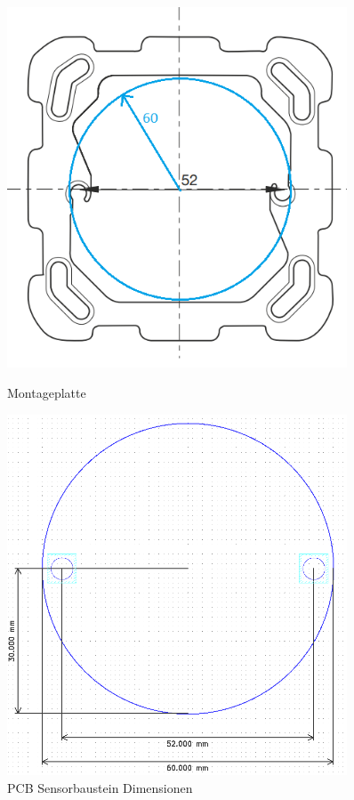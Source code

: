 \begin{figure}[htb]
	\centering
	\begin{minipage}[t]{0.45\linewidth}
		\centering
		\includegraphics[width=0.9\textwidth]{graphics/Montageplatte.png}
		\caption{Montageplatte \cite{hager_hager_kat1_08_technik_d_2019} }
		\label{pic: Montageplatte.png}
	\end{minipage}%
	\hfill
	\begin{minipage}[t]{0.45\linewidth}
		\centering
		\includegraphics[width=0.90\textwidth]{graphics/pcb_sensor_dimensionen.png}
		\caption{PCB Sensorbaustein Dimensionen}
		\label{pic: pcb_sensor_dimensionen.png}
	\end{minipage}
\end{figure}







